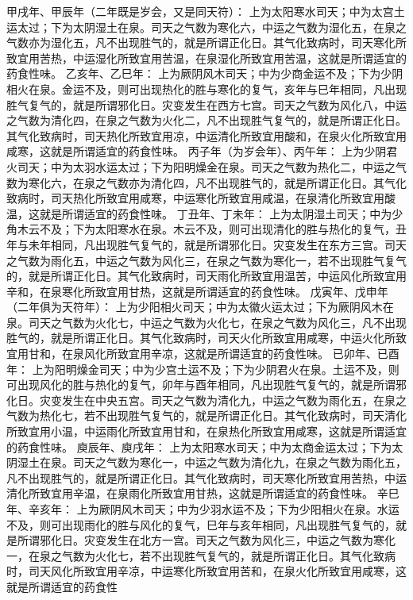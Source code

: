 \documentclass[a4paper,12pt,UTF8,twoside]{ctexbook}
\begin{document}
甲戌年、甲辰年（二年既是岁会，又是同天符）：
上为太阳寒水司天；中为太宫土运太过；下为太阴湿土在泉。司天之气数为寒化六，中运之气数为湿化五，在泉之气数亦为湿化五，凡不出现胜气的，就是所谓正化日。其气化致病时，司天寒化所致宜用苦热，中运湿化所致宜用苦温，在泉湿化所致宜用苦温，这就是所谓适宜的药食性味。
乙亥年、乙巳年：
上为厥阴风木司天；中为少商金运不及；下为少阴相火在泉。金运不及，则可出现热化的胜与寒化的复气，亥年与巳年相同，凡出现胜气复气的，就是所谓邪化日。灾变发生在西方七宫。司天之气数为风化八，中运之气数为清化四，在泉之气数为火化二，凡不出现胜气复气的，就是所谓正化日。其气化致病时，司天热化所致宜用凉，中运清化所致宜用酸和，在泉火化所致宜用咸寒，这就是所谓适宜的药食性味。
丙子年（为岁会年）、丙午年：
上为少阴君火司天；中为太羽水运太过；下为阳明燥金在泉。司天之气数为热化二，中运之气数为寒化六，在泉之气数亦为清化四，凡不出现胜气的，就是所谓正化日。其气化致病时，司天热化所致宜用咸寒，中运寒化所致宜用咸温，在泉清化所致宜用酸温，这就是所谓适宜的药食性味。
丁丑年、丁未年：
上为太阴湿土司天；中为少角木云不及；下为太阳寒水在泉。木云不及，则可出现清化的胜与热化的复气，丑年与未年相同，凡出现胜气复气的，就是所谓邪化日。灾变发生在东方三宫。司天之气数为雨化五，中运之气数为风化三，在泉之气数为寒化一，若不出现胜气复气的，就是所谓正化日。其气化致病时，司天雨化所致宜用温苦，中运风化所致宜用辛和，在泉寒化所致宜用甘热，这就是所谓适宜的药食性味。
戊寅年、戊申年（二年俱为天符年）：
上为少阳相火司天；中为太徽火运太过；下为厥阴风木在泉。司天之气数为火化七，中运之气数为火化七，在泉之气数为风化三，凡不出现胜气的，就是所谓正化日。其气化致病时，司天火化所致宜用咸寒，中运火化所致宜用甘和，在泉风化所致宜用辛凉，这就是所谓适宜的药食性味。
已卯年、已酉年：
上为阳明燥金司天；中为少宫土运不及；下为少阴君火在泉。土运不及，则可出现风化的胜与热化的复气，卯年与酉年相同，凡出现胜气复气的，就是所谓邪化日。灾变发生在中央五宫。司天之气数为清化九，中运之气数为雨化五，在泉之气数为热化七，若不出现胜气复气的，就是所谓正化日。其气化致病时，司天清化所致宜用小温，中运雨化所致宜用甘和，在泉热化所致宜用咸寒，这就是所谓适宜的药食性味。
庾辰年、庾戌年：
上为太阳寒水司天；中为太商金运太过；下为太阴湿土在泉。司天之气数为寒化一，中运之气数为清化九，在泉之气数为雨化五，凡不出现胜气的，就是所谓正化日。其气化致病时，司天寒化所致宜用苦热，中运清化所致宜用辛温，在泉雨化所致宜用甘热，这就是所谓适宜的药食性味。
辛巳年、辛亥年：
上为厥阴风木司天；中为少羽水运不及；下为少阳相火在泉。水运不及，则可出现雨化的胜与风化的复气，巳年与亥年相同，凡出现胜气复气的，就是所谓邪化日。灾变发生在北方一宫。司天之气数为风化三，中运之气数为寒化一，在泉之气数为火化七，若不出现胜气复气的，就是所谓正化日。其气化致病时，司天风化所致宜用辛凉，中运寒化所致宜用苦和，在泉火化所致宜用咸寒，这就是所谓适宜的药食性
\end{document}
